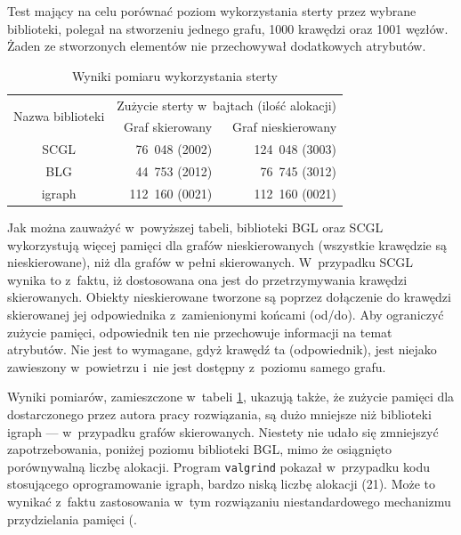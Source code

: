 \documentclass[a4paper,12pt,polish,oneside,openright]{thesis}
\newcommand\code[1]{\lstinline[style=line]{#1}}
\begin{document}
Test mający na celu porównać poziom wykorzystania sterty przez wybrane biblioteki, polegał na stworzeniu jednego grafu, 1000 krawędzi oraz 1001 węzłów.
Żaden ze stworzonych elementów nie przechowywał dodatkowych atrybutów.
\begin{table}[htb]
\caption{Wyniki pomiaru wykorzystania sterty}
\label{tab:mem_size}
\centering
\begin{tabular}{ | c | r | r | }
	\hline
	\multirow{2}{*}{Nazwa biblioteki } & \multicolumn{2}{|c|}{Zużycie sterty w~bajtach (ilość alokacji)} \\
	\cline{2-3}
		& Graf skierowany & Graf nieskierowany \\
	\hline \hline
	SCGL    & 76~048  (2002) & 124~048 (3003) \\ \hline
	BLG     & 44~753  (2012) &  76~745 (3012) \\ \hline
	igraph  & 112~160 (0021) & 112~160 (0021) \\ \hline
\end{tabular}
\end{table}

Jak można zauważyć w~powyższej tabeli, biblioteki BGL oraz SCGL wykorzystują więcej pamięci dla grafów nieskierowanych (wszystkie krawędzie są nieskierowane), niż dla grafów w pełni skierowanych.
W~przypadku SCGL wynika to z~faktu, iż dostosowana ona jest do przetrzymywania krawędzi skierowanych.
Obiekty nieskierowane tworzone są poprzez dołączenie do krawędzi skierowanej jej odpowiednika z~zamienionymi końcami (od/do).
Aby ograniczyć zużycie pamięci, odpowiednik ten nie przechowuje informacji na temat atrybutów.
Nie jest to wymagane, gdyż krawędź ta (odpowiednik), jest niejako zawieszony w~powietrzu i~nie jest dostępny z~poziomu samego grafu.

Wyniki pomiarów, zamieszczone w~tabeli \ref{tab:mem_size}, ukazują także, że zużycie pamięci dla dostarczonego przez autora pracy rozwiązania, są dużo mniejsze niż biblioteki igraph --- w~przypadku grafów skierowanych.
Niestety nie udało się zmniejszyć zapotrzebowania, poniżej poziomu biblioteki BGL, mimo że osiągnięto porównywalną liczbę alokacji.
Program \code{valgrind} pokazał w~przypadku kodu stosującego oprogramowanie igraph, bardzo niską liczbę alokacji (21).
Może to wynikać z~faktu zastosowania w~tym rozwiązaniu niestandardowego mechanizmu przydzielania pamięci (.
\end{document}
